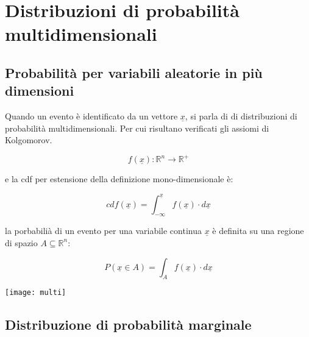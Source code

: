 \setcounter{chapter}{2}
  	\chapter{Distribuzioni di probabilit\`{a} multidimensionali}
  	
  	\section{Probabilit\`{a} per variabili aleatorie in pi\`{u} \\ dimensioni}
  	
  	Quando un evento \`{e} identificato da un vettore $\underline{x}$, si parla di di distribuzioni di probabilit\`{a} multidimensionali.  Per cui risultano verificati gli assiomi di Kolgomorov.
  	
  	\begin{equation*}
  		f(\underline{x}): \mathbb{R}^n \rightarrow \mathbb{R}^+
  	\end{equation*}
  	
  	e la cdf per estensione della definizione mono-dimensionale \`{e}:
  	
	\begin{equation*}
  		cdf(\underline{x}) = \int_{-\infty}^{\underline{x}}f(\underline{x}) \cdot d\underline{x}
	\end{equation*}
  	
  	
	la porbabili\`{a} di un evento per una variabile continua $\underline{x}$ \`{e} definita su una regione di spazio $A \subseteq \mathbb{R}^n$:
  	
	\vspace{0.2in}
  \begin{minipage}{0.5\textwidth}
		\begin{equation*}
  			P(\underline{x} \in A) = \int_{A}f(\underline{x}) \cdot d\underline{x}
  		\end{equation*}
  \end{minipage}
  \begin{minipage}{.4\textwidth}
    \centering
    \texttt{[image: multi]}

  \end{minipage}
	\vspace{0.2in}


	
\section{Distribuzione di probabilit\`{a} marginale}

